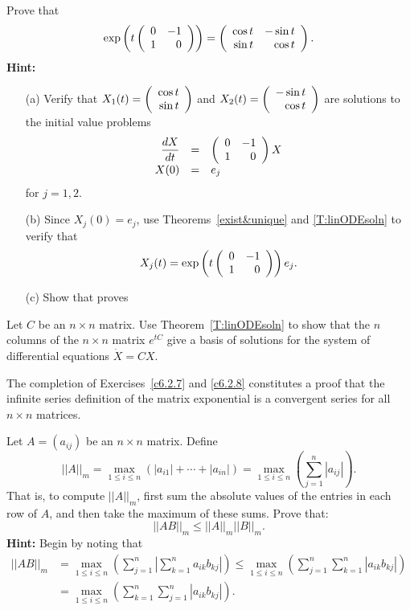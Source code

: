 \documentclass{ximera}
\begin{document}
\begin{exercise}  \label{c6.2.5C}
Prove that
\begin{equation}  \label{E:0-110E}
\exp\left(t\left(\begin{array}{rr} 0 & -1\\ 1 &0\end{array}\right)\right) =
\left(\begin{array}{rr} \cos t & -\sin t\\ \sin t &\cos t\end{array}\right).
\end{equation}
{\bf Hint:}
\begin{itemize}
\item[(a)] Verify that $X_1(t) = \left(\begin{array}{r} \cos t \\ \sin t\end{array}\right)$ and
$X_2(t) = \left(\begin{array}{r} -\sin t \\ \cos t\end{array}\right)$ are solutions to the initial value problems
\begin{equation}  \label{E:init3}
\begin{array}{rcl}
\displaystyle\frac{dX}{dt} & = & \left(\begin{array}{rr} 0 & -1\\ 1 &0\end{array}\right)X \\
X(0) & = & e_j
\end{array}
\end{equation}
for $j=1,2$.
\item[(b)] Since $X_j(0)=e_j$, use Theorems~\ref{exist&unique} and
\ref{T:linODEsoln} to verify that
\begin{equation}   \label{E:0-110}
X_j(t) = \exp\left(t\left(\begin{array}{rr} 0 & -1\\ 1 &0\end{array}\right)\right)e_j.
\end{equation}
\item[(c)]  Show that  proves 
\end{itemize}
\end{exercise}

\begin{exercise}  \label{c6.2.6A}
Let $C$ be an $n\times n$ matrix.  Use Theorem~\ref{T:linODEsoln} to show
that the $n$ columns of the $n\times n$ matrix $e^{tC}$ give a basis of
solutions for the system of differential equations $\dot{X}=CX$.
\end{exercise}

  The completion of Exercises~\ref{c6.2.7} and
\ref{c6.2.8} constitutes a proof that the infinite series definition of
the matrix exponential is a convergent series for all $n\times n$ matrices.

\begin{exercise}  \label{c6.2.7}
Let $A=(a_{ij})$ be an $n\times n$ matrix.  Define
\[
||A||_m = \max_{1\leq i\leq n} (|a_{i1}|+\cdots+|a_{in}|)
= \max_{1\leq i\leq n} \left(\sum_{j=1}^n|a_{ij}|\right).
\]
That is, to compute $||A||_m$, first sum the absolute values of the entries
in each row of $A$, and then take the maximum of these sums.  Prove that:
\[
||AB||_m \leq ||A||_m ||B||_m.
\]
{\bf Hint:} Begin by noting that
\begin{align*}
||AB||_m &=
\max_{1\leq i\leq n}\left(\sum_{j=1}^n\left|\sum_{k=1}^na_{ik}b_{kj}\right|
\right)\leq \max_{1\leq i\leq n}\left(\sum_{j=1}^n\sum_{k=1}^n\left|a_{ik}b_{kj}
           \right|\right) \\
  &= \max_{1\leq i\leq n}\left(\sum_{k=1}^n\sum_{j=1}^n
\left|a_{ik}b_{kj}\right|\right).
\end{align*}
\end{exercise}
\end{document}
